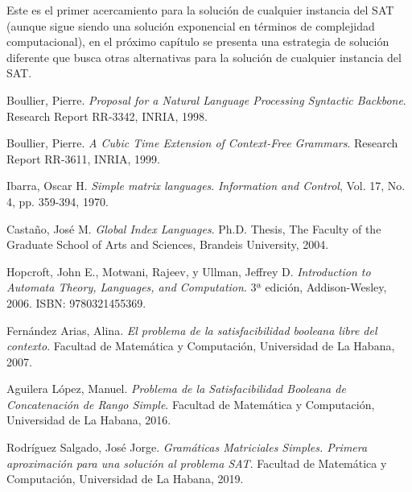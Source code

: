 \documentclass[12pt]{article}
\begin{document}
Este es el primer acercamiento para la solución de cualquier instancia del SAT (aunque sigue siendo una solución exponencial
en términos de complejidad computacional), en el próximo capítulo se presenta una estrategia de solución diferente
que busca otras alternativas para la solución de cualquier instancia del SAT.

\begin{thebibliography}{99}
      
      Boullier, Pierre. 
      \textit{Proposal for a Natural Language Processing Syntactic Backbone}. 
      Research Report RR-3342, INRIA, 1998. 
      
      Boullier, Pierre. 
      \textit{A Cubic Time Extension of Context-Free Grammars}. 
      Research Report RR-3611, INRIA, 1999. 
      
      Ibarra, Oscar H. 
      \textit{Simple matrix languages}. 
      \textit{Information and Control}, Vol. 17, No. 4, pp. 359-394, 1970. 
      
      Castaño, José M. 
      \textit{Global Index Languages}. 
      Ph.D. Thesis, The Faculty of the Graduate School of Arts and Sciences, Brandeis University, 2004.
      
      Hopcroft, John E., Motwani, Rajeev, y Ullman, Jeffrey D. 
      \textit{Introduction to Automata Theory, Languages, and Computation}. 
      3ª edición, Addison-Wesley, 2006. ISBN: 9780321455369.
      
      Fernández Arias, Alina. 
      \textit{El problema de la satisfacibilidad booleana libre del contexto}. 
      Facultad de Matemática y Computación, Universidad de La Habana, 2007.
      
      Aguilera López, Manuel. 
      \textit{Problema de la Satisfacibilidad Booleana de Concatenación de Rango Simple}. 
      Facultad de Matemática y Computación, Universidad de La Habana, 2016.
      
      Rodríguez Salgado, José Jorge. 
      \textit{Gramáticas Matriciales Simples. Primera aproximación para una solución al problema SAT}. 
      Facultad de Matemática y Computación, Universidad de La Habana, 2019.
      
\end{thebibliography}
\end{document}
